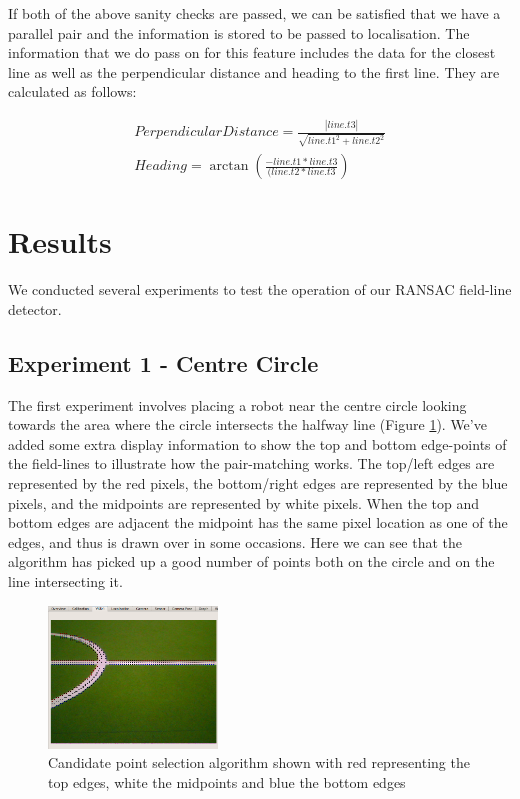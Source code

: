 \documentclass{article}
\begin{document}
If both of the above sanity checks are passed, we can be satisfied that we have a parallel pair and the information is stored to be passed to localisation. The information that we do pass on for this feature includes the data for the closest line as well as the perpendicular distance and heading to the first line. They are calculated as follows:

\begin{eqnarray}
Perpendicular Distance = \frac{|line.t3|}{\sqrt{line.t1^2 + line.t2^2}}\\
Heading = \arctan{(\frac{-line.t1 * line.t3}{(line.t2 * line.t3})}
\end{eqnarray}


\section{Results}
We conducted several experiments to test the operation of our RANSAC field-line detector. 

\subsection{Experiment 1 - Centre Circle}
The first experiment involves placing a robot near the centre circle looking towards the area where the circle intersects the halfway line (Figure \ref{fig:exp1}). We've added some extra display information to show the top and bottom edge-points of the field-lines to illustrate how the pair-matching works. The top/left edges are represented by the red pixels, the bottom/right edges are represented by the blue pixels, and the midpoints are represented by white pixels. When the top and bottom edges are adjacent the midpoint has the same pixel location as one of the edges, and thus is drawn over in some occasions. Here we can see that the algorithm has picked up a good number of points both on the circle and on the line intersecting it.

\begin{figure}
\centering
\includegraphics[width=0.4\textwidth]{Pictures/candidateCircle.png}
\caption{Candidate point selection algorithm shown with red representing the top edges, white the midpoints and blue the bottom edges}
\label{fig:exp1}
\end{figure}
\end{document}

